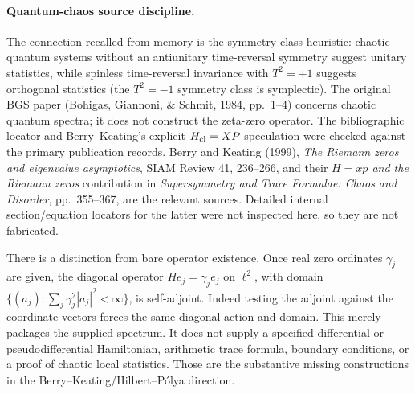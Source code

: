 \paragraph{Quantum-chaos source discipline.}
The connection recalled from memory is the symmetry-class heuristic: chaotic quantum systems without an antiunitary time-reversal symmetry suggest unitary statistics, while spinless time-reversal invariance with $T^2=+1$ suggests orthogonal statistics (the $T^2=-1$ symmetry class is symplectic). The original BGS paper (Bohigas, Giannoni, \& Schmit, 1984, pp.~1--4) concerns chaotic quantum spectra; it does not construct the zeta-zero operator. The bibliographic locator and Berry--Keating's explicit $H_{\rm cl}=XP$ speculation were checked against the primary publication records. Berry and Keating (1999), \emph{The Riemann zeros and eigenvalue asymptotics}, SIAM Review 41, 236--266, and their \emph{$H=xp$ and the Riemann zeros} contribution in \emph{Supersymmetry and Trace Formulae: Chaos and Disorder}, pp.~355--367, are the relevant sources. Detailed internal section/equation locators for the latter were not inspected here, so they are not fabricated.

There is a distinction from bare operator existence. Once real zero ordinates $\gamma_j$ are given, the diagonal operator $He_j=\gamma_je_j$ on $\ell^2$, with domain $\{(a_j):\sum_j\gamma_j^2|a_j|^2<\infty\}$, is self-adjoint. Indeed testing the adjoint against the coordinate vectors forces the same diagonal action and domain. This merely packages the supplied spectrum. It does not supply a specified differential or pseudodifferential Hamiltonian, arithmetic trace formula, boundary conditions, or a proof of chaotic local statistics. Those are the substantive missing constructions in the Berry--Keating/Hilbert--P\'olya direction.
